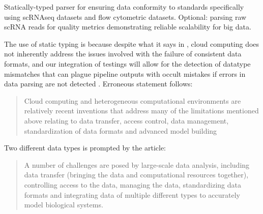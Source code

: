 \documentclass[11pt,letterpaper]{article}
\begin{document}

Statically-typed parser for ensuring data conformity to standards specifically using scRNAseq datasets and flow cytometric datasets. Optional: parsing raw scRNA reads for quality metrics demonstrating reliable scalability for big data.

The use of static typing is because despite what it says in \parencite{Schadt_2010}, cloud computing does not inherently address the issues involved with the failure of consistent data formats, and our integration of testings will allow for the detection of datatype mismatches that can plague pipeline outputs with occult mistakes if errors in data parsing are not detected \parencite{natella2018analyzing}. Erroneous statement follows:

\begin{quotation}
  Cloud computing and heterogeneous computational environments are relatively recent inventions that address many of the limitations mentioned above relating to data transfer, access control, data management, standardization of data formats and advanced model building
\end{quotation}

Two different data types is prompted by the \parencite{Schadt_2010} article:

\begin{quotation}
A number of challenges are posed by large-scale data analysis, including data transfer (bringing the data and computational resources together), controlling access to the data, managing the data, standardizing data formats and integrating data of multiple different types to accurately model biological systems.  
\end{quotation}
\end{document}
